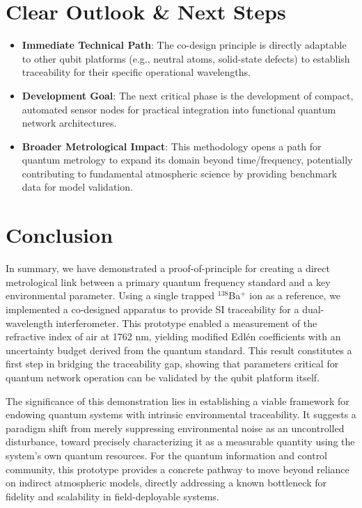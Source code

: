 \documentclass[aip,reprint,groupedaddress,onecolumn,superscriptaddress]{revtex4-2}
\begin{document}
\section{Clear Outlook \& Next Steps}
\begin{itemize}
    \item \textbf{Immediate Technical Path}: The co-design principle is directly adaptable to other qubit platforms (e.g., neutral atoms, solid-state defects) to establish traceability for their specific operational wavelengths.
    \item \textbf{Development Goal}: The next critical phase is the development of compact, automated sensor nodes for practical integration into functional quantum network architectures.
    \item \textbf{Broader Metrological Impact}: This methodology opens a path for quantum metrology to expand its domain beyond time/frequency, potentially contributing to fundamental atmospheric science by providing benchmark data for model validation.
\end{itemize}

\newpage

\section*{Conclusion}

In summary, we have demonstrated a proof-of-principle for creating a direct metrological link between a primary quantum frequency standard and a key environmental parameter. Using a single trapped $^{138}$Ba$^+$ ion as a reference, we implemented a co-designed apparatus to provide SI traceability for a dual-wavelength interferometer. This prototype enabled a measurement of the refractive index of air at 1762 nm, yielding modified Edlén coefficients with an uncertainty budget derived from the quantum standard. This result constitutes a first step in bridging the traceability gap, showing that parameters critical for quantum network operation can be validated by the qubit platform itself.

The significance of this demonstration lies in establishing a viable framework for endowing quantum systems with intrinsic environmental traceability. It suggests a paradigm shift from merely suppressing environmental noise as an uncontrolled disturbance, toward precisely characterizing it as a measurable quantity using the system's own quantum resources. For the quantum information and control community, this prototype provides a concrete pathway to move beyond reliance on indirect atmospheric models, directly addressing a known bottleneck for fidelity and scalability in field-deployable systems.
\end{document}
